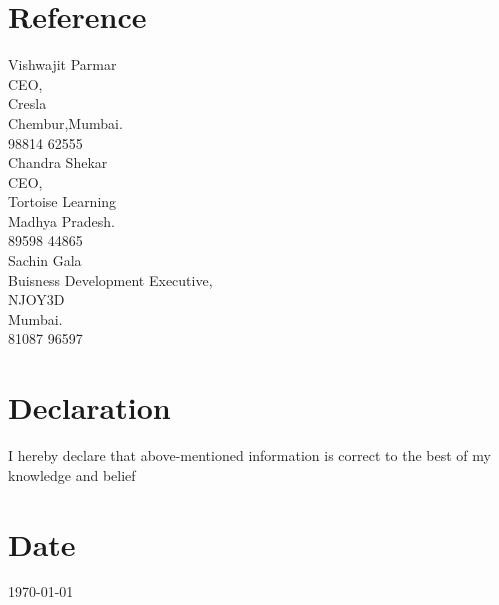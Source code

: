 \documentclass[margin, 11pt]{res} %
\begin{document}
\begin{resume}
\vspace{.15in}
\section{Reference}

Vishwajit Parmar\\
CEO,\\
Cresla\\
Chembur,Mumbai.\\
98814 62555\\

Chandra Shekar\\
CEO,\\
Tortoise Learning\\
Madhya Pradesh.\\
89598 44865\\

Sachin Gala\\
Buisness Development Executive,\\
NJOY3D\\
Mumbai.\\
81087 96597\\[0.2mm]


\vspace{.15in}
\section{Declaration}

I hereby declare that above-mentioned information is correct to the best of my knowledge and belief


\vspace{.15in}
\section{Date} 

\date{\thedate}{\today}

\end{resume}
\end{document}
